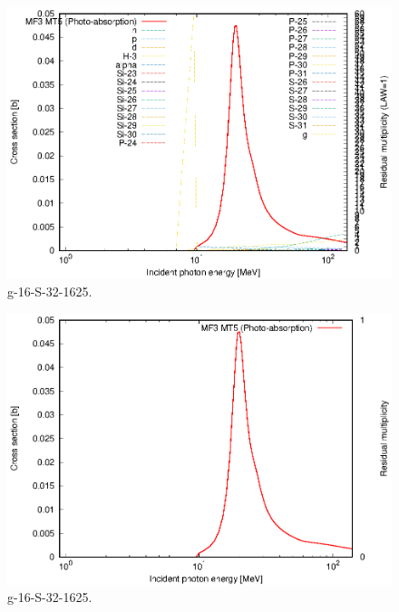\begin{figure}
 \includegraphics[width=\linewidth]{eps/g_16-S-32_1625.eps}
  \caption{g-16-S-32-1625.}
\end{figure}
\begin{figure}
 \includegraphics[width=\linewidth]{eps-law0/g_16-S-32_1625.eps}
 \caption{g-16-S-32-1625.}
\end{figure}
\newpage \clearpage

